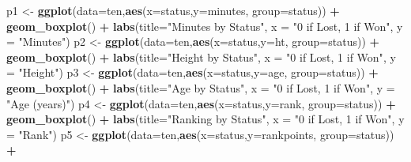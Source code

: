 \documentclass[]{article}
\newenvironment{Shaded}{\begin{snugshade}}{\end{snugshade}}
\newcommand{\DataTypeTok}[1]{\textcolor[rgb]{0.13,0.29,0.53}{#1}}
\newcommand{\KeywordTok}[1]{\textcolor[rgb]{0.13,0.29,0.53}{\textbf{#1}}}
\newcommand{\NormalTok}[1]{#1}
\newcommand{\OperatorTok}[1]{\textcolor[rgb]{0.81,0.36,0.00}{\textbf{#1}}}
\newcommand{\StringTok}[1]{\textcolor[rgb]{0.31,0.60,0.02}{#1}}
\begin{document}
\begin{Shaded}
\begin{Highlighting}[]
\NormalTok{p1 <-}\StringTok{ }\KeywordTok{ggplot}\NormalTok{(}\DataTypeTok{data=}\NormalTok{ten,}\KeywordTok{aes}\NormalTok{(}\DataTypeTok{x=}\NormalTok{status,}\DataTypeTok{y=}\NormalTok{minutes, }\DataTypeTok{group=}\NormalTok{status)) }\OperatorTok{+}
\StringTok{  }\KeywordTok{geom_boxplot}\NormalTok{() }\OperatorTok{+}\StringTok{ }
\StringTok{  }\KeywordTok{labs}\NormalTok{(}\DataTypeTok{title=}\StringTok{"Minutes by Status"}\NormalTok{,}
       \DataTypeTok{x =} \StringTok{"0 if Lost, 1 if Won"}\NormalTok{,}
       \DataTypeTok{y =} \StringTok{"Minutes"}\NormalTok{)}
\NormalTok{p2 <-}\StringTok{ }\KeywordTok{ggplot}\NormalTok{(}\DataTypeTok{data=}\NormalTok{ten,}\KeywordTok{aes}\NormalTok{(}\DataTypeTok{x=}\NormalTok{status,}\DataTypeTok{y=}\NormalTok{ht, }\DataTypeTok{group=}\NormalTok{status)) }\OperatorTok{+}
\StringTok{  }\KeywordTok{geom_boxplot}\NormalTok{() }\OperatorTok{+}\StringTok{ }
\StringTok{  }\KeywordTok{labs}\NormalTok{(}\DataTypeTok{title=}\StringTok{"Height by Status"}\NormalTok{,}
       \DataTypeTok{x =} \StringTok{"0 if Lost, 1 if Won"}\NormalTok{,}
       \DataTypeTok{y =} \StringTok{"Height"}\NormalTok{)}
\NormalTok{p3 <-}\StringTok{ }\KeywordTok{ggplot}\NormalTok{(}\DataTypeTok{data=}\NormalTok{ten,}\KeywordTok{aes}\NormalTok{(}\DataTypeTok{x=}\NormalTok{status,}\DataTypeTok{y=}\NormalTok{age, }\DataTypeTok{group=}\NormalTok{status)) }\OperatorTok{+}
\StringTok{  }\KeywordTok{geom_boxplot}\NormalTok{() }\OperatorTok{+}\StringTok{ }
\StringTok{  }\KeywordTok{labs}\NormalTok{(}\DataTypeTok{title=}\StringTok{"Age by Status"}\NormalTok{,}
       \DataTypeTok{x =} \StringTok{"0 if Lost, 1 if Won"}\NormalTok{,}
       \DataTypeTok{y =} \StringTok{"Age (years)"}\NormalTok{)}
\NormalTok{p4 <-}\StringTok{ }\KeywordTok{ggplot}\NormalTok{(}\DataTypeTok{data=}\NormalTok{ten,}\KeywordTok{aes}\NormalTok{(}\DataTypeTok{x=}\NormalTok{status,}\DataTypeTok{y=}\NormalTok{rank, }\DataTypeTok{group=}\NormalTok{status)) }\OperatorTok{+}
\StringTok{  }\KeywordTok{geom_boxplot}\NormalTok{() }\OperatorTok{+}\StringTok{ }
\StringTok{  }\KeywordTok{labs}\NormalTok{(}\DataTypeTok{title=}\StringTok{"Ranking by Status"}\NormalTok{,}
       \DataTypeTok{x =} \StringTok{"0 if Lost, 1 if Won"}\NormalTok{,}
       \DataTypeTok{y =} \StringTok{"Rank"}\NormalTok{)}
\NormalTok{p5 <-}\StringTok{ }\KeywordTok{ggplot}\NormalTok{(}\DataTypeTok{data=}\NormalTok{ten,}\KeywordTok{aes}\NormalTok{(}\DataTypeTok{x=}\NormalTok{status,}\DataTypeTok{y=}\NormalTok{rankpoints, }\DataTypeTok{group=}\NormalTok{status)) }\OperatorTok{+}

\end{Highlighting}
\end{Shaded}
\end{document}
